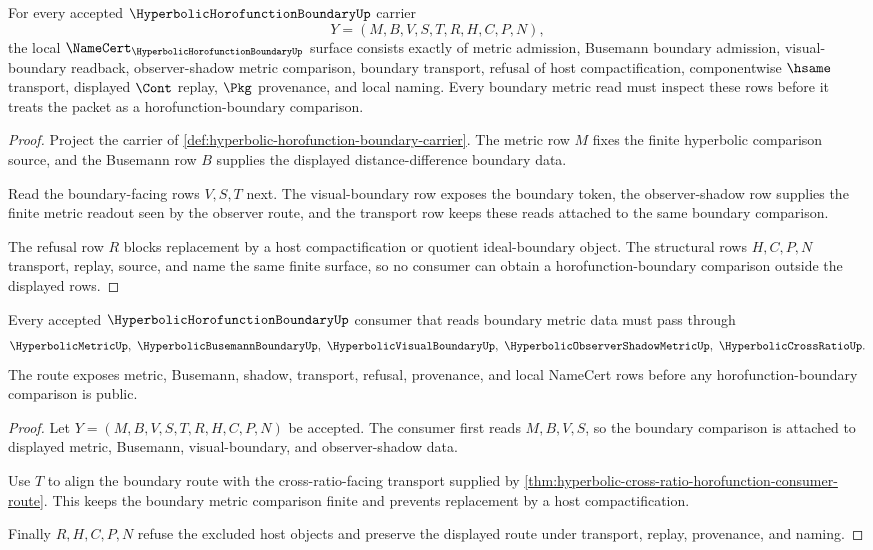 \begin{theorem}
\label{thm:hyperbolic-horofunction-boundary-namecert-obligations}
For every accepted $\HyperbolicHorofunctionBoundaryUp$ carrier
$$
Y=(M,B,V,S,T,R,H,C,P,N),
$$
the local $\NameCert_{\HyperbolicHorofunctionBoundaryUp}$ surface consists exactly of metric admission, Busemann boundary admission, visual-boundary readback, observer-shadow metric comparison, boundary transport, refusal of host compactification, componentwise $\hsame$ transport, displayed $\Cont$ replay, $\Pkg$ provenance, and local naming. Every boundary metric read must inspect these rows before it treats the packet as a horofunction-boundary comparison.
\end{theorem}
\begin{proof}
Project the carrier of \autoref{def:hyperbolic-horofunction-boundary-carrier}. The metric row $M$ fixes the finite hyperbolic comparison source, and the Busemann row $B$ supplies the displayed distance-difference boundary data.

Read the boundary-facing rows $V,S,T$ next. The visual-boundary row exposes the boundary token, the observer-shadow row supplies the finite metric readout seen by the observer route, and the transport row keeps these reads attached to the same boundary comparison.

The refusal row $R$ blocks replacement by a host compactification or quotient ideal-boundary object. The structural rows $H,C,P,N$ transport, replay, source, and name the same finite surface, so no consumer can obtain a horofunction-boundary comparison outside the displayed rows.
\end{proof}

\begin{theorem}
\label{thm:hyperbolic-horofunction-boundary-metric-readout-route}
Every accepted $\HyperbolicHorofunctionBoundaryUp$ consumer that reads boundary metric data must pass through
$$
\HyperbolicMetricUp,\ \HyperbolicBusemannBoundaryUp,\ \HyperbolicVisualBoundaryUp,\ \HyperbolicObserverShadowMetricUp,\ \HyperbolicCrossRatioUp .
$$
The route exposes metric, Busemann, shadow, transport, refusal, provenance, and local NameCert rows before any horofunction-boundary comparison is public.
\end{theorem}
\begin{proof}
Let $Y=(M,B,V,S,T,R,H,C,P,N)$ be accepted. The consumer first reads $M,B,V,S$, so the boundary comparison is attached to displayed metric, Busemann, visual-boundary, and observer-shadow data.

Use $T$ to align the boundary route with the cross-ratio-facing transport supplied by \autoref{thm:hyperbolic-cross-ratio-horofunction-consumer-route}. This keeps the boundary metric comparison finite and prevents replacement by a host compactification.

Finally $R,H,C,P,N$ refuse the excluded host objects and preserve the displayed route under transport, replay, provenance, and naming.
\end{proof}

